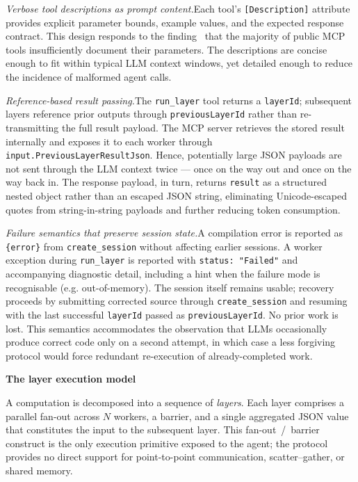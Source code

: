 \textit{Verbose tool descriptions as prompt content.}\quad Each tool's \texttt{[Description]} attribute provides explicit parameter bounds, example values, and the expected response contract. This design responds to the finding~\cite{luo2025mcpsmelly} that the majority of public MCP tools insufficiently document their parameters. The descriptions are concise enough to fit within typical LLM context windows, yet detailed enough to reduce the incidence of malformed agent calls.

\textit{Reference-based result passing.}\quad The \texttt{run\_layer} tool returns a \texttt{layerId}; subsequent layers reference prior outputs through \texttt{previousLayerId} rather than re-transmitting the full result payload. The MCP server retrieves the stored result internally and exposes it to each worker through \texttt{input.PreviousLayerResultJson}. Hence, potentially large JSON payloads are not sent through the LLM context twice --- once on the way out and once on the way back in. The response payload, in turn, returns \texttt{result} as a structured nested object rather than an escaped JSON string, eliminating Unicode-escaped quotes from string-in-string payloads and further reducing token consumption.

\textit{Failure semantics that preserve session state.}\quad A compilation error is reported as \texttt{\{error\}} from \texttt{create\_session} without affecting earlier sessions. A worker exception during \texttt{run\_layer} is reported with \texttt{status: "Failed"} and accompanying diagnostic detail, including a hint when the failure mode is recognisable (e.g. out-of-memory). The session itself remains usable; recovery proceeds by submitting corrected source through \texttt{create\_session} and resuming with the last successful \texttt{layerId} passed as \texttt{previousLayerId}. No prior work is lost. This semantics accommodates the observation that LLMs occasionally produce correct code only on a second attempt, in which case a less forgiving protocol would force redundant re-execution of already-completed work.

\medskip\noindent\textbf{The layer execution model}\par\nopagebreak
A computation is decomposed into a sequence of \emph{layers}. Each layer comprises a parallel fan-out across $N$ workers, a barrier, and a single aggregated JSON value that constitutes the input to the subsequent layer. This fan-out~/~barrier construct is the only execution primitive exposed to the agent; the protocol provides no direct support for point-to-point communication, scatter--gather, or shared memory.

